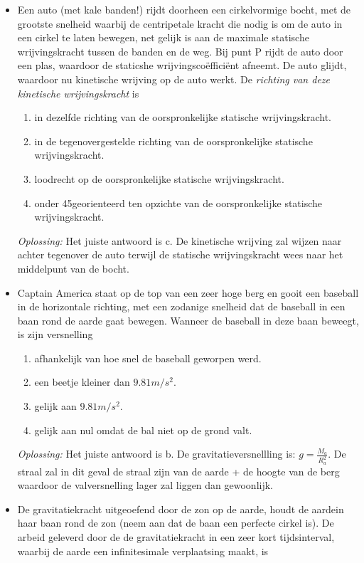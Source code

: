 \documentclass[12pt,a4paper]{article}
\begin{document}
\begin{itemize}
	\newline
	\item Een auto (met kale banden!) rijdt doorheen een cirkelvormige bocht, met de grootste snelheid waarbij de centripetale kracht die nodig is om de auto in een cirkel te laten bewegen, net gelijk is aan de maximale statische wrijvingskracht tussen de banden en de weg. Bij punt P rijdt de auto door een plas, waardoor de staticshe wrijvingscoëfficiënt afneemt. De auto glijdt, waardoor nu kinetische wrijving op de auto werkt. De \textit{richting van deze kinetische wrijvingskracht} is
	\begin{enumerate}[label=\alph*]
		\item in dezelfde richting van de oorspronkelijke statische wrijvingskracht.
		\item in de tegenovergestelde richting van de oorspronkelijke statische wrijvingskracht.
		\item loodrecht op de oorspronkelijke statische wrijvingskracht.
		\item onder 45\degree georienteerd ten opzichte van de oorspronkelijke statische wrijvingskracht.
	\end{enumerate}
	\textit{Oplossing:} Het juiste antwoord is c. De kinetische wrijving zal wijzen naar achter tegenover de auto terwijl de statische wrijvingskracht wees naar het middelpunt van de bocht. 
	\newline
	\item Captain America staat op de top van een zeer hoge berg en gooit een baseball in de horizontale richting, met een zodanige snelheid dat de baseball in een baan rond de aarde gaat bewegen. Wanneer de baseball in deze baan beweegt, is zijn versnelling
	\begin{enumerate}[label=\alph*]
		\item afhankelijk van hoe snel de baseball geworpen werd.
		\item een beetje kleiner dan \(9.81 m/s^2\).
	 	\item gelijk aan \(9.81 m/s^2\).
	 	\item gelijk aan nul omdat de bal niet op de grond valt. 
	\end{enumerate}
	\textit{Oplossing:} Het juiste antwoord is b. De gravitatieversnellling is: \(g = \frac{M_a}{R_a^2}\). De straal zal in dit geval de straal zijn van de aarde + de hoogte van de berg waardoor de valversnelling lager zal liggen dan gewoonlijk. 
	\newline
	\item De gravitatiekracht uitgeoefend door de zon op de aarde, houdt de aardein haar baan rond de zon (neem aan dat de baan een perfecte cirkel is). De arbeid geleverd door de de gravitatiekracht in een zeer kort tijdsinterval, waarbij de aarde een infinitesimale verplaatsing maakt, is

\end{itemize}
\end{document}

